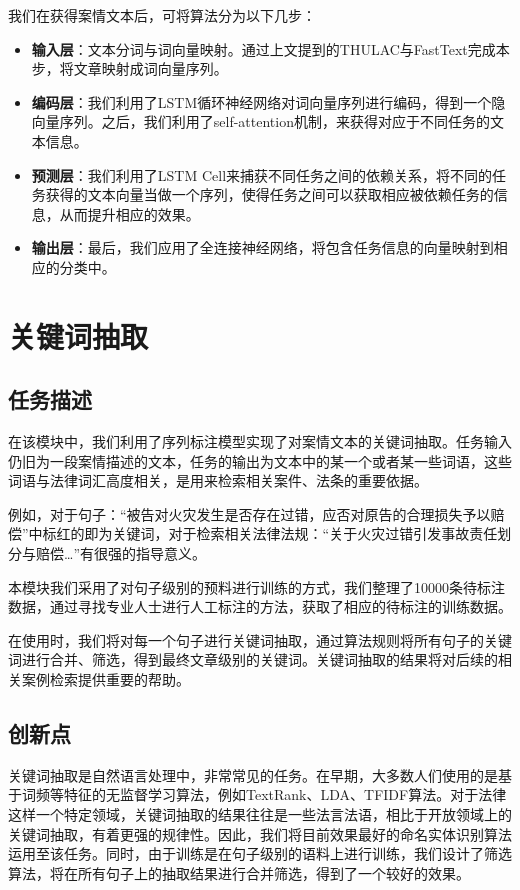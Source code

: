 我们在获得案情文本后，可将算法分为以下几步：
\begin{itemize}
	\item \textbf{输入层}：文本分词与词向量映射。通过上文提到的THULAC与FastText完成本步，将文章映射成词向量序列。
	\item \textbf{编码层}：我们利用了LSTM循环神经网络对词向量序列进行编码，得到一个隐向量序列。之后，我们利用了self-attention机制，来获得对应于不同任务的文本信息。
	\item \textbf{预测层}：我们利用了LSTM Cell来捕获不同任务之间的依赖关系，将不同的任务获得的文本向量当做一个序列，使得任务之间可以获取相应被依赖任务的信息，从而提升相应的效果。
	\item \textbf{输出层}：最后，我们应用了全连接神经网络，将包含任务信息的向量映射到相应的分类中。
\end{itemize}


\section{关键词抽取}
\subsection{任务描述}
在该模块中，我们利用了序列标注模型实现了对案情文本的关键词抽取。任务输入仍旧为一段案情描述的文本，任务的输出为文本中的某一个或者某一些词语，这些词语与法律词汇高度相关，是用来检索相关案件、法条的重要依据。

例如，对于句子：“被告对{\color{red}火灾}发生是否存在{\color{red}过错}，应否对原告的合理损失予以{\color{red}赔偿}”中标红的即为关键词，对于检索相关法律法规：“关于{\color{red}火灾过错}引发事故责任划分与{\color{red}赔偿}…”有很强的指导意义。

本模块我们采用了对句子级别的预料进行训练的方式，我们整理了10000条待标注数据，通过寻找专业人士进行人工标注的方法，获取了相应的待标注的训练数据。

在使用时，我们将对每一个句子进行关键词抽取，通过算法规则将所有句子的关键词进行合并、筛选，得到最终文章级别的关键词。关键词抽取的结果将对后续的相关案例检索提供重要的帮助。

\subsection{创新点}

关键词抽取是自然语言处理中，非常常见的任务。在早期，大多数人们使用的是基于词频等特征的无监督学习算法，例如TextRank、LDA、TFIDF算法。对于法律这样一个特定领域，关键词抽取的结果往往是一些法言法语，相比于开放领域上的关键词抽取，有着更强的规律性。因此，我们将目前效果最好的命名实体识别算法运用至该任务。同时，由于训练是在句子级别的语料上进行训练，我们设计了筛选算法，将在所有句子上的抽取结果进行合并筛选，得到了一个较好的效果。

